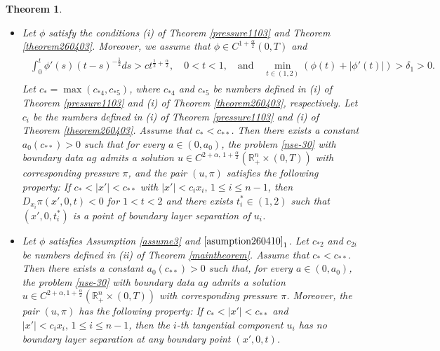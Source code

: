 \documentclass{amsart}
\newtheorem{theorem}[defn]{Theorem}
\numberwithin{equation}{section}
\newcommand{\R}{{ \mathbb R}^n}
\newcommand {\al}{\alpha}
\newcommand{\de}{\delta}
\begin{document}
\begin{theorem}\label{maintheorem(NS)}
\begin{itemize}

\item[(i)]
Let $\phi$ satisfy the conditions   (i) of Theorem \ref{pressure1103} and   Theorem \ref{theorem260403}.     
Moreover, we assume that   $ \phi \in C^{ 1 +\frac{\al}2} ( 0, T )$  and 
\begin{align}\label{asumption260410} 
\begin{split}
\int_{0}^t   \phi' (s)     (t-s)^{-\frac12}  ds > c t^{\frac12 +\frac{\al}2}, \quad 0 < t< 1,\quad\mbox{and}\quad
 \min_{t\in (1,2)} (\phi(t) + |\phi'(t)|) > \de_1>0.
 \end{split}
\end{align} 
Let  $ c_{*} = \max(c_{*4}, c_{*5} )$, where $c_{*4}$ and $c_{*5}$ be numbers defined in (i) of   Theorem \ref{pressure1103} and (i) of Theorem \ref{theorem260403}, respectively.
Let $c_i$  be the numbers  defined in (i) of   Theorem \ref{pressure1103} and   (i) of  Theorem \ref{theorem260403}.   Assume that $ c_* < c_{**}$.   Then there exists a constant  $ a_0 ( c_{**} )  >0$ such that for every \(a\in(0,a_0)\), the problem \eqref{nse-30} with boundary data \(ag\) admits a solution
$\displaystyle 
u\in C^{2+\alpha,\,1+\frac{\alpha}{2}}(\mathbb{R}_+^n\times(0,T))$
with corresponding pressure \(\pi\), and the pair \((u,\pi)\) satisfies the following property:
If $ c_{*} < |x'| < c_{**}$  with   $ |x'| < c_i x_i, \, 1 \leq i \leq n-1$, then $ D_{x_i} \pi (x',0,t) < 0$ for $1<t <2$ and  there exists $t_i^* \in (1,  2)$ such that $ (x', 0, t_i^*)$ is a point of boundary layer  separation  of $u_i$.
 
\item[(ii)] 
Let $\phi$ satisfies  Assumption \ref{assume3} and $\eqref{asumption260410}_1$. Let $ c_{*2}$ and $c_{2i}$ be numbers defined in (ii) of Theorem \ref{maintheorem}.  Assume that $ c_* < c_{**}$.  Then there exists a constant $ a_0 ( c_{**} )  >0$ such that, for every \(a\in(0,a_0)\), the problem \eqref{nse-30} with boundary data \(ag\) admits a solution $\displaystyle u \in C^{2 +\al, 1 +\frac{\al}2}(\R_+ \times (0, T))$  with corresponding pressure \(\pi\). Moreover, the pair \((u,\pi)\) has the following property:
If $ c_{*} < |x'| < c_{**}$  and  $ |x'| < c_i x_i, \, 1 \leq i \leq n-1$, then the \(i\)-th tangential component \(u_i\) has no boundary layer separation at any boundary point \((x',0,t)\).

 
\end{itemize}

\end{theorem}
\end{document}
